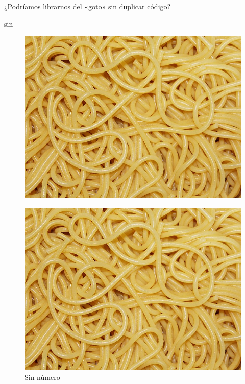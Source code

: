 \documentclass{tfg_domingo}
\begin{document}
¿Podríamos librarnos del «goto» sin duplicar código?

\NoCaptionOfAlgo
\begin{algorithm}[H]
\caption{sin}
\DontPrintSemicolon
{}
\end{algorithm}
\vspace{5mm}

\lipsum[39-41]

\begin{figure}[ht!]
\begin{center}
\includegraphics[width=\linewidth]{espaguetis}
\caption{}
\end{center}
\end{figure}

\lipsum[42-43]

\begin{figure}[ht!]
\begin{center}
\includegraphics[width=\linewidth]{espaguetis}
\caption*{Sin número}
\end{center}
\end{figure}
\end{document}
